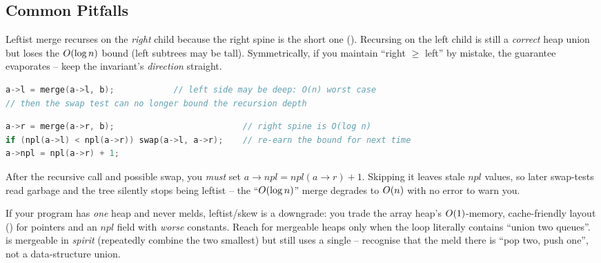 \subsection{Common Pitfalls}

\begin{warningbox}
Leftist merge recurses on the \emph{right} child because the right spine is the short one
(). Recursing on the left child is still a \emph{correct} heap union but loses the
$O(\log n)$ bound (left subtrees may be tall). Symmetrically, if you maintain ``right $\ge$ left''
by mistake, the guarantee evaporates -- keep the invariant's \emph{direction} straight.
\end{warningbox}
\begin{lstlisting}[caption={\textcolor{warningred}{WRONG}: recurse the (possibly tall) left subtree -- no log bound}, language=C++, basicstyle=\ttfamily\small]
a->l = merge(a->l, b);            // left side may be deep: O(n) worst case
// then the swap test can no longer bound the recursion depth
\end{lstlisting}
\begin{lstlisting}[caption={\textcolor{successgreen}{RIGHT}: recurse the short right spine, then re-leftist}, language=C++, basicstyle=\ttfamily\small]
a->r = merge(a->r, b);                          // right spine is O(log n)
if (npl(a->l) < npl(a->r)) swap(a->l, a->r);    // re-earn the bound for next time
a->npl = npl(a->r) + 1;
\end{lstlisting}

\begin{warningbox}
After the recursive call and possible swap, you \emph{must} set $a\to\mathit{npl}=\mathit{npl}(a{\to}r)+1$.
Skipping it leaves stale $\mathit{npl}$ values, so later swap-tests read garbage and the tree silently stops
being leftist -- the ``$O(\log n)$'' merge degrades to $O(n)$ with no error to warn you.
\end{warningbox}

\begin{warningbox}
If your program has \emph{one} heap and never melds, leftist/skew is a downgrade: you trade the array heap's
$O(1)$-memory, cache-friendly layout () for pointers and an $\mathit{npl}$ field with
\emph{worse} constants. Reach for mergeable heaps only when the loop literally contains ``union two queues''.
 is mergeable in \emph{spirit} (repeatedly combine the two smallest) but still uses a
single  -- recognise that the meld there is ``pop two, push one'', not a data-structure
union.
\end{warningbox}

